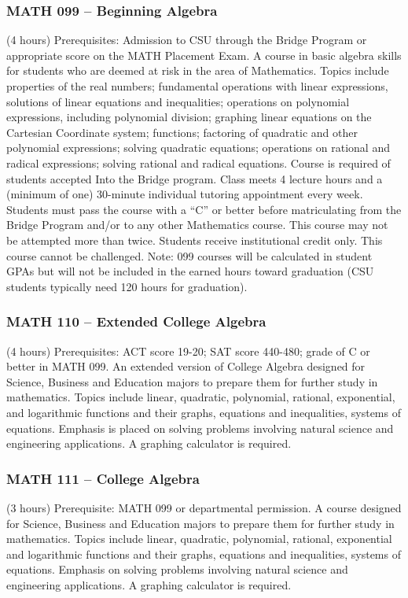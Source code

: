 \subsubsection{MATH 099 -- Beginning Algebra}
(4 hours) Prerequisites: Admission to CSU through the Bridge Program or appropriate score on the MATH Placement Exam. A course in basic algebra skills for students who are deemed at risk in the area of Mathematics. Topics include properties of the real numbers; fundamental operations with linear expressions, solutions of linear equations and inequalities; operations on polynomial expressions, including polynomial division; graphing linear equations on the Cartesian Coordinate system; functions; factoring of quadratic and other polynomial expressions; solving quadratic equations; operations on rational and radical expressions; solving rational and radical equations. Course is required of students accepted Into the Bridge program. Class meets 4 lecture hours and a (minimum of one) 30-minute individual tutoring appointment every week. Students must pass the course with a “C” or better before matriculating from the Bridge Program and/or to any other Mathematics course. This course may not be attempted more than twice. Students receive institutional credit only. This course cannot be challenged. Note: 099 courses will be calculated in student GPAs but will not be included in the earned hours toward graduation (CSU students typically need 120 hours for graduation).

\subsubsection{MATH 110 -- Extended College Algebra}
(4 hours) Prerequisites: ACT score 19-20; SAT score 440-480; grade of C or better in MATH 099. An extended version of College Algebra designed for Science, Business and Education majors to prepare them for further study in mathematics. Topics include linear, quadratic, polynomial, rational, exponential, and logarithmic functions and their graphs, equations and inequalities, systems of equations. Emphasis is placed on solving problems involving natural science and engineering applications. A graphing calculator is required.

\subsubsection{MATH 111 -- College Algebra}
(3 hours) Prerequisite: MATH 099 or departmental permission. A course designed for Science, Business and Education majors to prepare them for further study in mathematics. Topics include linear, quadratic, polynomial, rational, exponential and logarithmic functions and their graphs, equations and inequalities, systems of equations. Emphasis on solving problems involving natural science and engineering applications. A graphing calculator is required.

